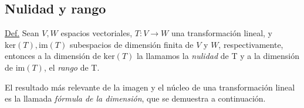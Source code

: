 \documentclass[12pt]{article}
\begin{document}
\subsection{Nulidad y rango}

\begin{tcolorbox}
    \underline{Def.} Sean $V,W$ espacios vectoriales, $T:V\to W$ una transformación lineal, y $\text{ker}(T), \text{im}(T)$ subespacios de dimensión finita de $V$ y $W$, respectivamente, entonces a la dimensión de $\text{ker}(T)$ la llamamos la \emph{nulidad} de T y a la dimensión de $\text{im}(T)$, el \emph{rango} de T. 
\end{tcolorbox}

El resultado más relevante de la imagen y el núcleo de una transformación lineal es la llamada \emph{fórmula de la dimensión}, que se demuestra a continuación.
\end{document}
